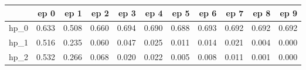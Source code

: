 \begin{tabular}{lrrrrrrrrrr}
\toprule
{} &   ep 0 &   ep 1 &   ep 2 &   ep 3 &   ep 4 &   ep 5 &   ep 6 &   ep 7 &   ep 8 &   ep 9 \\
\midrule
hp\_0 &  0.633 &  0.508 &  0.660 &  0.694 &  0.690 &  0.688 &  0.693 &  0.692 &  0.692 &  0.692 \\
hp\_1 &  0.516 &  0.235 &  0.060 &  0.047 &  0.025 &  0.011 &  0.014 &  0.021 &  0.004 &  0.000 \\
hp\_2 &  0.532 &  0.266 &  0.068 &  0.020 &  0.022 &  0.005 &  0.008 &  0.011 &  0.001 &  0.000 \\
\bottomrule
\end{tabular}
